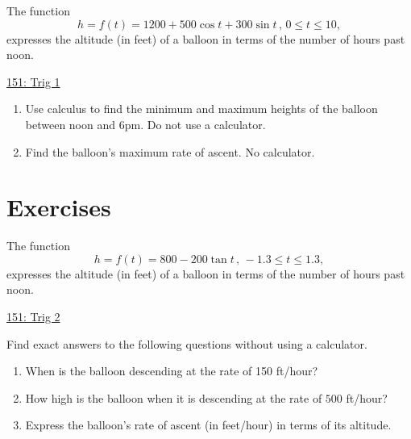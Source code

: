 \documentclass{ximera}
\begin{document}
\begin{question}  \label{Qdfethnnjjjuu}
The function
\[
    h = f(t) = 1200 + 500\cos t + 300\sin t \, , \, 0\leq t \leq 10 ,
\]
expresses the altitude (in feet) of a balloon in terms of the number of hours past noon.

\begin{onlineOnly}
    \begin{center}
\end{center}
\end{onlineOnly}

\href{https://www.desmos.com/calculator/f1ldi6yrek}{151: Trig 1}

\begin{enumerate}

\item Use calculus to find the minimum and maximum heights of the balloon between noon and 6pm. Do not use a calculator.

\item Find the balloon's maximum rate of ascent. No calculator.

\end{enumerate}

\end{question}





\section{Exercises}



\begin{question}  \label{Q:LKJMFJUFegvt4}
The function
\[
       h = f(t) = 800 - 200 \tan t \, , \, -1.3\leq t\leq 1.3,
\]
expresses the altitude (in feet) of a balloon in terms of the number of hours past noon.

\begin{onlineOnly}
    \begin{center}
\end{center}
\end{onlineOnly}

\href{https://www.desmos.com/calculator/re6nqofgs0}{151: Trig 2}

Find exact answers to the following questions without using a calculator.


\begin{enumerate}
\item When is the balloon descending at the rate of 150 ft/hour?

\item How high is the balloon when it is descending at the rate of $500$ ft/hour?

\item Express the balloon's rate of ascent (in feet/hour) in terms of its altitude.

\end{enumerate}

\end{question}
\end{document}
